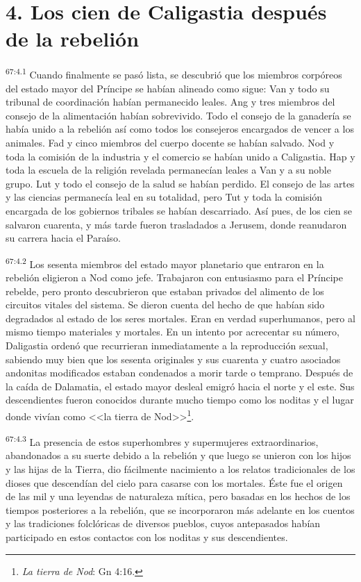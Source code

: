 \section*{4. Los cien de Caligastia después de la rebelión}
\par
\textsuperscript{67:4.1} Cuando finalmente se pasó lista, se descubrió que los miembros corpóreos del estado mayor del Príncipe se habían alineado como sigue: Van y todo su tribunal de coordinación habían permanecido leales. Ang y tres miembros del consejo de la alimentación habían sobrevivido. Todo el consejo de la ganadería se había unido a la rebelión así como todos los consejeros encargados de vencer a los animales. Fad y cinco miembros del cuerpo docente se habían salvado. Nod y toda la comisión de la industria y el comercio se habían unido a Caligastia. Hap y toda la escuela de la religión revelada permanecían leales a Van y a su noble grupo. Lut y todo el consejo de la salud se habían perdido. El consejo de las artes y las ciencias permanecía leal en su totalidad, pero Tut y toda la comisión encargada de los gobiernos tribales se habían descarriado. Así pues, de los cien se salvaron cuarenta, y más tarde fueron trasladados a Jerusem, donde reanudaron su carrera hacia el Paraíso.

\par
\textsuperscript{67:4.2} Los sesenta miembros del estado mayor planetario que entraron en la rebelión eligieron a Nod como jefe. Trabajaron con entusiasmo para el Príncipe rebelde, pero pronto descubrieron que estaban privados del alimento de los circuitos vitales del sistema. Se dieron cuenta del hecho de que habían sido degradados al estado de los seres mortales. Eran en verdad superhumanos, pero al mismo tiempo materiales y mortales. En un intento por acrecentar su número, Daligastia ordenó que recurrieran inmediatamente a la reproducción sexual, sabiendo muy bien que los sesenta originales y sus cuarenta y cuatro asociados andonitas modificados estaban condenados a morir tarde o temprano. Después de la caída de Dalamatia, el estado mayor desleal emigró hacia el norte y el este. Sus descendientes fueron conocidos durante mucho tiempo como los noditas y el lugar donde vivían como <<la tierra de Nod>>\footnote{\textit{La tierra de Nod}: Gn 4:16.}.

\par
\textsuperscript{67:4.3} La presencia de estos superhombres y supermujeres extraordinarios, abandonados a su suerte debido a la rebelión y que luego se unieron con los hijos y las hijas de la Tierra, dio fácilmente nacimiento a los relatos tradicionales de los dioses que descendían del cielo para casarse con los mortales. Éste fue el origen de las mil y una leyendas de naturaleza mítica, pero basadas en los hechos de los tiempos posteriores a la rebelión, que se incorporaron más adelante en los cuentos y las tradiciones folclóricas de diversos pueblos, cuyos antepasados habían participado en estos contactos con los noditas y sus descendientes.


